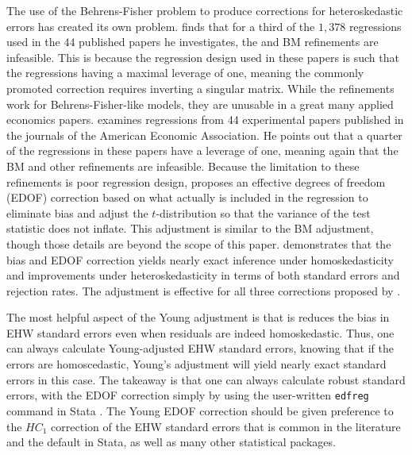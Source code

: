 \documentclass[11pt]{article}
\begin{document}
The use of the Behrens-Fisher problem to produce corrections for heteroskedastic errors has created its own problem. \cite{young_improved_2016} finds that for a third of the $1,378$ regressions used in the $44$ published papers he investigates, the \cite{mackinnon_heteroskedasticity-consistent_1985} and BM refinements are infeasible. This is because the regression design used in these papers is such that the regressions having a maximal leverage of one, meaning the commonly promoted correction requires inverting a singular matrix. While the refinements work for Behrens-Fisher-like models, they are unusable in a great many applied economics papers. \cite{young_improved_2016} examines regressions from 44 experimental papers published in the journals of the American Economic Association. He points out that a quarter of the regressions in these papers have a leverage of one, meaning again that the BM and other refinements are infeasible. Because the limitation to these refinements is poor regression design, \cite{young_improved_2016} proposes an effective degrees of freedom (EDOF) correction based on what actually is included in the regression to eliminate bias and adjust the $t$-distribution so that the variance of the test statistic does not inflate. This adjustment is similar to the BM adjustment, though those details are beyond the scope of this paper. \cite{young_improved_2016} demonstrates that the bias and EDOF correction yields nearly exact inference under homoskedasticity and improvements under heteroskedasticity in terms of both standard errors and rejection rates. The adjustment is effective for all three corrections proposed by \cite{mackinnon_heteroskedasticity-consistent_1985}.

The most helpful aspect of the Young adjustment is that is reduces the bias in EHW standard errors even when residuals are indeed homoskedastic. Thus, one can always calculate Young-adjusted EHW standard errors, knowing that if the errors are homoscedastic, Young's adjustment will yield nearly exact standard errors in this case. The takeaway is that one can always calculate robust standard errors, with the EDOF correction simply by using the user-written \texttt{edfreg} command in Stata \citep{young_edfreg_2016}. The Young EDOF correction should be given preference to the $HC_1$ correction of the EHW standard errors that is common in the literature and the default in Stata, as well as many other statistical packages.

\end{document}
